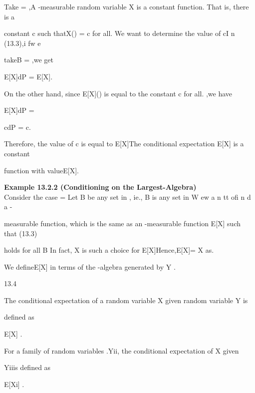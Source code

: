 Take ={ \emptyset,\Omega }A -measurable random variable X is a constant function. That is, there is a

constant c such thatX() = c for all. \in \Omega We want to determine the value of cI n (13.3),i fw e

takeB = \Omega ,we get

\int

\Omega

E[X\vert{\emptyset,\Omega }]dP = E[X].

On the other hand, since E[X\vert{}]() is equal to the constant c for all. ,we have

\int

\Omega

E[X\vert{\emptyset,\Omega }]dP =

\int

\Omega

cdP = c.

Therefore, the value of c is equal to E[X]The conditional expectation E[X\vert{\emptyset,\Omega }] is a constant

function with valueE[X].

\textbf{Example 13.2.2 (Conditioning on the Largest\sigma-Algebra)} \\

Consider the case = Let B be any set in , ie., B is any set in W ew a n tt ofi n d a -

measurable function, which is the same as an -measurable function E[X\vert{}] such that (13.3)

holds for all B \in{}In fact, X is such a choice for E[X\vert{}]Hence,E[X\vert{}]= X as.

We defineE[X\vertY] in terms of the \sigma-algebra generated by Y .

\begin{defbox}{13.4}
\end{defbox}

The conditional expectation of a random variable X given random variable Y is

defined as

E[X\vertY] .

For a family of random variables .{Yi}i\inI , the conditional expectation of X given

{Yi}i\inI is defined as

E[Xi\inI ] .


